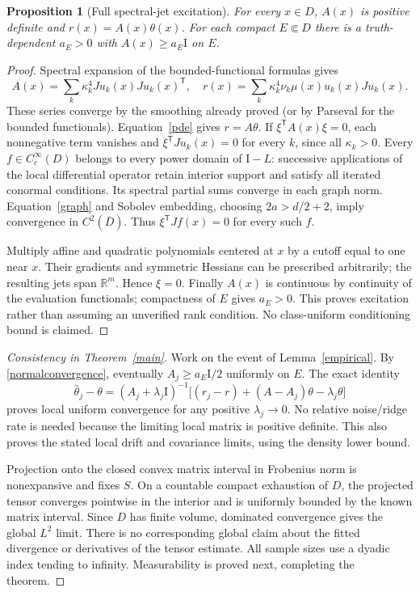 \documentclass[11pt]{article}
\newtheorem{proposition}[theorem]{Proposition}
\theoremstyle{remark}\newtheorem{remark}[theorem]{Remark}
\newcommand{\R}{\mathbb R}
\newcommand{\Id}{\mathrm I}
\newcommand{\tr}{\mathsf T}
\begin{document}
\begin{proposition}[Full spectral-jet excitation]\label{excitation}
For every $x\in D$, $A(x)$ is positive definite and $r(x)=A(x)\theta(x)$.
For each compact $E\Subset D$ there is a truth-dependent $a_E>0$ with
$A(x)\geq a_E\Id$ on $E$.
\end{proposition}
\begin{proof}
Spectral expansion of the bounded-functional formulas gives
\[
 A(x)=\sum_k\kappa_k^4 Ju_k(x)Ju_k(x)^\tr,\quad
 r(x)=\sum_k\kappa_k^4\nu_k\mu(x)u_k(x)Ju_k(x).
\]
These series converge by the smoothing already proved (or by Parseval for
the bounded functionals). Equation~\eqref{pde} gives $r=A\theta$.
If $\xi^\tr A(x)\xi=0$, each nonnegative term vanishes and
$\xi^\tr Ju_k(x)=0$ for every $k$, since all $\kappa_k>0$.
Every $f\in C_c^\infty(D)$ belongs to every power domain of $\Id-L$:
successive applications of the local differential operator retain interior
support and satisfy all iterated conormal conditions. Its spectral partial
sums converge in each graph norm. Equation~\eqref{graph} and Sobolev
embedding, choosing $2a>d/2+2$, imply convergence in $C^2(\overline D)$.
Thus $\xi^\tr Jf(x)=0$ for every such $f$.

Multiply affine and quadratic polynomials centered at $x$ by a cutoff equal
to one near $x$. Their gradients and symmetric Hessians can be prescribed
arbitrarily; the resulting jets span $\R^m$. Hence $\xi=0$.
Finally $A(x)$ is continuous by continuity of the evaluation functionals;
compactness of $E$ gives $a_E>0$. This proves excitation rather than assuming
an unverified rank condition. No class-uniform conditioning bound is claimed.
\end{proof}

\begin{proof}[Consistency in Theorem~\ref{main}]
Work on the event of Lemma~\ref{empirical}. By
\eqref{normalconvergence}, eventually $A_j\geq a_E\Id/2$ uniformly on
$E$. The exact identity
\[
 \widehat\theta_j-\theta=(A_j+\lambda_j\Id)^{-1}
 \big[(r_j-r)+(A-A_j)\theta-\lambda_j\theta\big]
\]
proves local uniform convergence for any positive $\lambda_j\to0$.
No relative noise/ridge rate is needed because the limiting local matrix is
positive definite. This also proves the stated local drift and covariance
limits, using the density lower bound.

Projection onto the closed convex matrix interval in Frobenius norm is
nonexpansive and fixes $S$. On a countable compact exhaustion of $D$, the
projected tensor converges pointwise in the interior and is uniformly bounded
by the known matrix interval. Since $D$ has finite volume, dominated
convergence gives the global $L^2$ limit. There is no corresponding global
claim about the fitted divergence or derivatives of the tensor estimate.
All sample sizes use a dyadic index tending to infinity. Measurability is
proved next, completing the theorem.
\end{proof}
\end{document}
